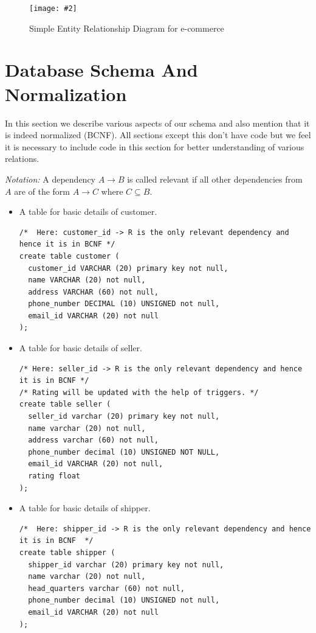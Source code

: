 \documentclass[a4paper,12pt]{article}
\newcommand{\iph}[2]{
    \texttt{[image: \#2]}
}
\newcommand{\ita}[1]{
    \textit{#1}
}
\newcommand{\dph}[3]{
\begin{figure}[H]
  \centering
  \iph{#1}{#2}
  \caption{#3}
\end{figure}
}
\begin{document}
\dph{1}{ERDF}{Simple Entity Relationship Diagram for e-commerce}

\section{Database Schema And Normalization}
In this section we describe various aspects of our schema and also mention that it is indeed normalized (BCNF). All sections except this don't have code but we feel it is necessary to include code in this section for better understanding of various relations. 

\ita{Notation: }A dependency $A \rightarrow B$ is called relevant if all other dependencies from $A$ are of the form $A \rightarrow C$ where $C \subseteq B$.

\begin{itemize}
  \item A table for basic details of customer.
\begin{verbatim}
/*  Here: customer_id -> R is the only relevant dependency and hence it is in BCNF */
create table customer (
  customer_id VARCHAR (20) primary key not null,
  name VARCHAR (20) not null,
  address VARCHAR (60) not null,
  phone_number DECIMAL (10) UNSIGNED not null,
  email_id VARCHAR (20) not null
);
\end{verbatim}
  \item A table for basic details of seller.
  \begin{verbatim}
/* Here: seller_id -> R is the only relevant dependency and hence it is in BCNF */
/* Rating will be updated with the help of triggers. */
create table seller (
  seller_id varchar (20) primary key not null,
  name varchar (20) not null,
  address varchar (60) not null,
  phone_number decimal (10) UNSIGNED NOT NULL,
  email_id VARCHAR (20) not null,
  rating float
);
  \end{verbatim}
  \item A table for basic details of shipper.
  \begin{verbatim}
/*  Here: shipper_id -> R is the only relevant dependency and hence it is in BCNF  */
create table shipper (
  shipper_id varchar (20) primary key not null,
  name varchar (20) not null,
  head_quarters varchar (60) not null,
  phone_number decimal (10) UNSIGNED not null,
  email_id VARCHAR (20) not null
);


\end{verbatim}
\end{itemize}
\end{document}
